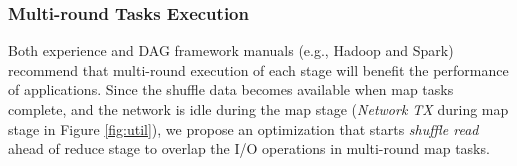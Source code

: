 {\subsubsection{Multi-round Tasks Execution}\label{multi}
Both experience and DAG framework manuals (e.g., Hadoop and Spark) recommend that multi-round execution of each stage will benefit the performance of applications.
Since the shuffle data becomes available when map tasks complete, 
and the network is idle during the map stage (\textit{Network TX} during map stage in Figure \ref{fig:util}), 
we propose an optimization that starts \textit{shuffle read} ahead of reduce stage to overlap the I/O operations in multi-round map tasks. 
}

